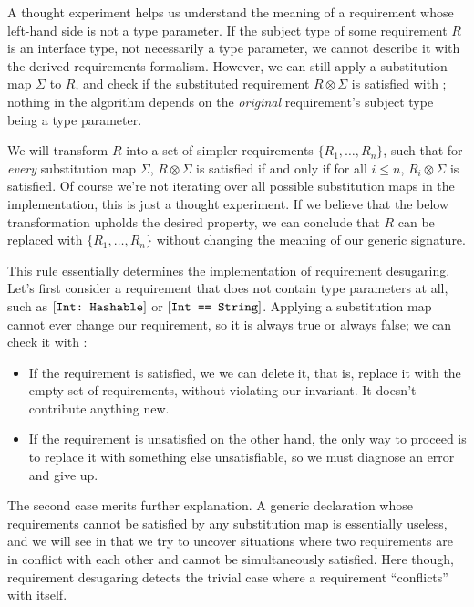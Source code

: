 \documentclass[../generics]{subfiles}
\begin{document}
A thought experiment helps us understand the meaning of a requirement whose left-hand side is not a type parameter. If the subject type of some requirement $R$ is an interface type, not necessarily a type parameter, we cannot describe it with the derived requirements formalism. However, we can still apply a substitution map $\Sigma$ to $R$, and check if the substituted requirement $R\otimes\Sigma$ is satisfied with ; nothing in the algorithm depends on the \emph{original} requirement's subject type being a type parameter.

We will transform $R$ into a set of simpler requirements $\{R_1,\ldots,R_n\}$, such that for \emph{every} substitution map $\Sigma$, $R\otimes\Sigma$ is satisfied if and only if for all $i\le n$, $R_i\otimes\Sigma$ is satisfied. Of course we're not iterating over all possible substitution maps in the implementation, this is just a thought experiment. If we believe that the below transformation upholds the desired property, we can conclude that $R$ can be replaced with $\{R_1,\ldots,R_n\}$ without changing the meaning of our generic signature.

This rule essentially determines the implementation of requirement desugaring. Let's first consider a requirement that does not contain type parameters at all, such as $[\texttt{Int:~Hashable}]$ or $[\texttt{Int == String}]$. Applying a substitution map cannot ever change our requirement, so it is always true or always false; we can check it with :
\begin{itemize}
\item If the requirement is satisfied, we we can delete it, that is, replace it with the empty set of requirements, without violating our invariant. It doesn't contribute anything new.
\item If the requirement is unsatisfied on the other hand, the only way to proceed is to replace it with something else unsatisfiable, so we must diagnose an error and give up.
\end{itemize}
The second case merits further explanation. A generic declaration whose requirements cannot be satisfied by any substitution map is essentially useless, and we will see in  that we try to uncover situations where two requirements are in conflict with each other and cannot be simultaneously satisfied. Here though, requirement desugaring detects the trivial case where a requirement ``conflicts'' with itself.
\end{document}
